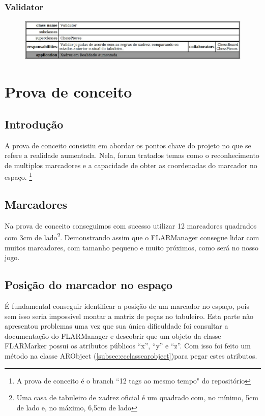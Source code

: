\documentclass[a4paper,12pt]{book}
\begin{document}
      \subsection{Validator}
      \label{subsec:crcvalidator}
      \begin{figure}[H]
	    \centering
	    \includegraphics[width=1.0\textwidth]{crc/Validator}
	    \end{figure}

	\chapter{Prova de conceito}
	\label{ch:provadeconceito}
		\section{Introdu\c c\~ao}
		\label{sec:pcintroducao}
		A prova de conceito consistiu em abordar os pontos chave do projeto no que se
		refere a realidade aumentada. Nela, foram tratados temas como o reconhecimento
		de multiplos marcadores e a capacidade de obter as coordenadas do marcador no
		espa\c co. \footnote{A prova de conceito \'e o branch ``12 tags ao mesmo
		tempo" do reposit\'orio}
		
		\section{Marcadores}
		\label{sec:pcmarcadores}
		Na prova de conceito conseguimos com sucesso utilizar 12 marcadores quadrados
		com 3cm de lado\footnote{Uma casa de tabuleiro de xadrez oficial \'e um
		quadrado com, no m\'inimo, 5cm de lado e, no m\'aximo, 6,5cm de lado}. Demonstrando assim que
		o FLARManager consegue lidar com muitos marcadores, com tamanho pequeno e muito pr\'oximos, como ser\'a no
		nosso jogo.
		
		\section{Posi\c c\~ao do marcador no espa\c co}
		\label{sec:pcposicaodomarcadornoespaco}
		\'E fundamental conseguir identificar a posi\c c\~ao de um marcador no espa\c
		co, pois sem isso seria imposs\'ivel montar a matriz de pe\c cas no tabuleiro.
		Esta parte n\~ao apresentou problemas uma vez que sua \'unica dificuldade foi
		consultar a documenta\c c\~ao do FLARManager e descobrir que um objeto da
		classe FLARMarker possui os atributos p\'ublicos ``x'', ``y'' e ``z''. Com
		isso foi feito um m\'etodo na classe ARObject
		(\ref{subsec:ecclassearobject})para pegar estes atributos.
		
\end{document}
